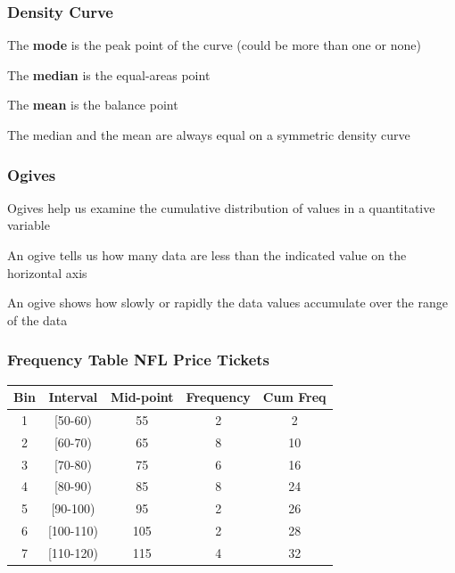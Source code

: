 \documentclass[12pt]{beamer}\usepackage[]{graphicx}\usepackage[]{color}
\begin{document}

\begin{frame}
\frametitle{Density Curve}

\bi
  \item The \textbf{mode} is the peak point of the curve (could be more than one or none)
  \item The \textbf{median} is the equal-areas point
  \item The \textbf{mean} is the balance point
  \item The median and the mean are always equal on a symmetric density curve
\ei
\eb

\end{frame}


\begin{frame}
\begin{center}
\Huge{}
\end{center}
\end{frame}


\begin{frame}
\frametitle{Ogives}

\bbi
  \item Ogives help us examine the cumulative distribution of values in a quantitative variable
  \item An ogive tells us how many data are less than the indicated value on the horizontal axis
  \item An ogive shows how slowly or rapidly the data values accumulate over the range of the data
\ei
\eb

\end{frame}


\begin{frame}
\frametitle{Frequency Table NFL Price Tickets}

\begin{center}
 \begin{tabular}{c c c c c}
  \hline
  Bin & Interval & Mid-point & Frequency & Cum Freq \\
  \hline
  1 & [50-60) & 55 & 2 & 2 \\
  2 & [60-70) & 65 & 8 & 10 \\
  3 & [70-80) & 75 & 6 & 16 \\
  4 & [80-90) & 85 & 8 & 24 \\
  5 & [90-100) & 95 & 2 & 26 \\
  6 & [100-110) & 105 & 2 & 28 \\
  7 & [110-120) & 115 & 4 & 32 \\
 \end{tabular}
\end{center}

\end{frame}
\end{document}
